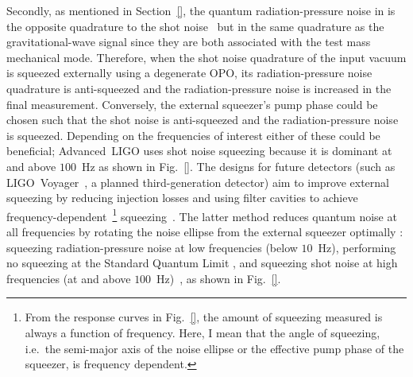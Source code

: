 Secondly, as mentioned in Section~\ref{}, the quantum radiation-pressure noise in is the opposite quadrature to the shot noise~\cite{}  but in the same quadrature as the gravitational-wave signal since they are both associated with the test mass mechanical mode. Therefore, when the shot noise quadrature of the input vacuum is squeezed externally using a degenerate OPO, its radiation-pressure noise quadrature is anti-squeezed and the radiation-pressure noise is increased in the final measurement. Conversely, the external squeezer's pump phase could be chosen such that the shot noise is anti-squeezed and the radiation-pressure noise is squeezed. Depending on the frequencies of interest either of these could be beneficial; Advanced~LIGO uses shot noise squeezing because it is dominant at and above $100$~Hz as shown in Fig.~\ref{}. The designs for future detectors (such as LIGO~Voyager~\cite{}, a planned third-generation detector) aim to improve external squeezing by reducing injection losses and using filter cavities to achieve frequency-dependent~\footnote{From the response curves in Fig.~\ref{}, the amount of squeezing measured is always a function of frequency. Here, I mean that the angle of squeezing, i.e.\ the semi-major axis of the noise ellipse or the effective pump phase of the squeezer, is frequency dependent.} squeezing~\cite{}. The latter method reduces quantum noise at all frequencies by rotating the noise ellipse from the external squeezer optimally : squeezing radiation-pressure noise at low frequencies (below $10$~Hz), performing no squeezing at the Standard Quantum Limit , and squeezing shot noise at high frequencies (at and above $100$~Hz)~\cite{}, as shown in Fig.~\ref{}. 
